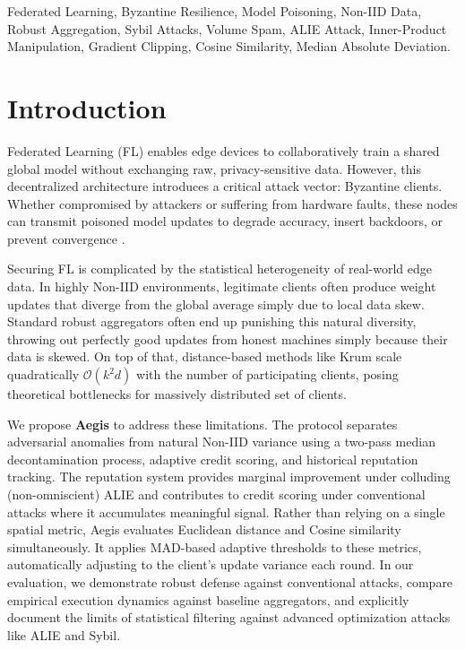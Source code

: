 \documentclass[10pt, conference]{IEEEtran}
\begin{document}
\begin{IEEEkeywords}
Federated Learning, Byzantine Resilience, Model Poisoning, Non-IID Data, Robust Aggregation, Sybil Attacks, Volume Spam, ALIE Attack, Inner-Product Manipulation, Gradient Clipping, Cosine Similarity, Median Absolute Deviation.
\end{IEEEkeywords}

\section{Introduction}
Federated Learning (FL) enables edge devices to collaboratively train a shared global model without exchanging raw, privacy-sensitive data. However, this decentralized architecture introduces a critical attack vector: Byzantine clients. Whether compromised by attackers or suffering from hardware faults, these nodes can transmit poisoned model updates to degrade accuracy, insert backdoors, or prevent convergence \cite{blanchard2017}.

Securing FL is complicated by the statistical heterogeneity of real-world edge data. In highly Non-IID environments, legitimate clients often produce weight updates that diverge from the global average simply due to local data skew. Standard robust aggregators often end up punishing this natural diversity, throwing out perfectly good updates from honest machines simply because their data is skewed. On top of that, distance-based methods like Krum scale quadratically $\mathcal{O}(k^2 d)$ with the number of participating clients, posing theoretical bottlenecks for massively distributed set of clients.

We propose \textbf{Aegis} to address these limitations. The protocol separates adversarial anomalies from natural Non-IID variance using a two-pass median decontamination process, adaptive credit scoring, and historical reputation tracking. The reputation system provides marginal improvement under colluding (non-omniscient) ALIE and contributes to credit scoring under conventional attacks where it accumulates meaningful signal. Rather than relying on a single spatial metric, Aegis evaluates Euclidean distance and Cosine similarity simultaneously. It applies MAD-based adaptive thresholds to these metrics, automatically adjusting to the client's update variance each round. In our evaluation, we demonstrate robust defense against conventional attacks, compare empirical execution dynamics against baseline aggregators, and explicitly document the limits of statistical filtering against advanced optimization attacks like ALIE and Sybil.
\end{document}
